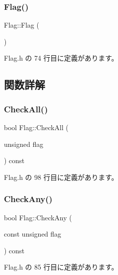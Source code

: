 \subsubsection{\texorpdfstring{Flag()}{Flag()}}
{\footnotesize\ttfamily Flag\+::\+Flag (\begin{DoxyParamCaption}{ }\end{DoxyParamCaption})\hspace{0.3cm}{\ttfamily [inline]}}



 Flag.\+h の 74 行目に定義があります。



\subsection{関数詳解}
\mbox{\label{class_flag_ac2ff8a3589aeefcf2672304da6339351}} 
\subsubsection{\texorpdfstring{Check\+All()}{CheckAll()}}
{\footnotesize\ttfamily bool Flag\+::\+Check\+All (\begin{DoxyParamCaption}\item[{unsigned}]{flag }\end{DoxyParamCaption}) const\hspace{0.3cm}{\ttfamily [inline]}}



 Flag.\+h の 98 行目に定義があります。

\mbox{\label{class_flag_a3efc58733cf4aae0ff1ab0752aa4c702}} 
\subsubsection{\texorpdfstring{Check\+Any()}{CheckAny()}}
{\footnotesize\ttfamily bool Flag\+::\+Check\+Any (\begin{DoxyParamCaption}\item[{const unsigned}]{flag }\end{DoxyParamCaption}) const\hspace{0.3cm}{\ttfamily [inline]}}



 Flag.\+h の 85 行目に定義があります。

